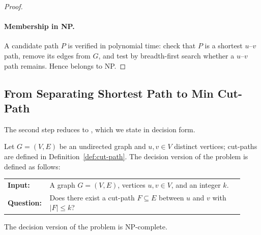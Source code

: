 \begin{proof}
\paragraph{Membership in NP.}
A candidate path $P$ is verified in polynomial time: check that $P$ is a shortest $u$--$v$ path, remove its edges from $G$, and test by breadth-first search whether a $u$--$v$ path remains.
Hence \SSP{} belongs to NP.
\end{proof}

\subsection{From Separating Shortest Path to Min Cut-Path}\label{sec:ssp-to-mcp}
The second step reduces \SSP{} to \MinCutPath, which we state in decision form.

\begin{problem}
Let $G=(V,E)$ be an undirected graph and $u,v \in V$ distinct vertices; cut-paths are defined in Definition~\ref{def:cut-path}.
The decision version of the \MinCutPath{} problem is defined as follows:

\begin{center}
\begin{tabular}{p{0.12\linewidth}p{0.8\linewidth}}
\textbf{Input:} & A graph $G=(V,E)$, vertices $u,v \in V$, and an integer $k$. \\
\textbf{Question:} & Does there exist a cut-path $F \subseteq E$ between $u$ and $v$ with $|F|\leq k$?
\end{tabular}
\end{center}
\end{problem}

\begin{theorem}
\label{thm:mcp-np-complete}
The decision version of the \MinCutPath{} problem is NP-complete.
\end{theorem}

